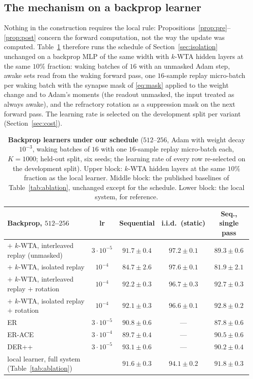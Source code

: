 \documentclass{article}
\newcommand{\kwta}{$k$-WTA}
\begin{document}
\subsection{The mechanism on a backprop learner}
\label{sec:bpk}
Nothing in the construction requires the local rule: Propositions~\ref{prop:pre}--\ref{prop:post}
concern the forward computation, not the way the update was computed. Table~\ref{tab:bpk}
therefore runs the schedule of Section~\ref{sec:isolation} unchanged on a backprop MLP of the
same width with \kwta{} hidden layers at the same $10\%$ fraction: waking batches of $16$
with an unmasked Adam step, awake sets read from the waking forward pass, one $16$-sample
replay micro-batch per waking batch with the synapse mask of \eqref{eq:mask} applied to the
weight change and to Adam's moments (the readout unmasked, the input treated as always
awake), and the refractory rotation as a suppression mask on the next forward pass. The
learning rate is selected on the development split per variant (Section~\ref{sec:cost}).

\begin{table}[t]
\centering
\caption{\textbf{Backprop learners under our schedule} ($512$--$256$, Adam with weight decay
$10^{-3}$, waking batches of $16$ with one $16$-sample replay micro-batch each, $K{=}1000$;
held-out split, six seeds; the learning rate of every row re-selected on the development
split). Upper block: \kwta{} hidden layers at the same $10\%$ fraction as the local learner.
Middle block: the published baselines of Table~\ref{tab:ablation}, unchanged except for the
schedule. Lower block: the local system, for reference.}
\label{tab:bpk}
\small
\begin{tabular}{@{}lcccc@{}}
\toprule
Backprop, $512$--$256$ & lr & Sequential & i.i.d.\ (static) & Seq., single pass \\
\midrule
$+$ \kwta{}, interleaved replay (unmasked) & $3{\cdot}10^{-5}$ & $91.7\pm0.4$ & $97.2\pm0.1$ & $89.3\pm0.6$ \\
$+$ \kwta{}, isolated replay & $10^{-4}$ & $84.7\pm2.6$ & $97.6\pm0.1$ & $81.9\pm2.1$ \\
$+$ \kwta{}, interleaved replay $+$ rotation & $10^{-4}$ & $92.2\pm0.3$ & $96.7\pm0.3$ & $92.7\pm0.3$ \\
$+$ \kwta{}, isolated replay $+$ rotation & $10^{-4}$ & $92.1\pm0.3$ & $96.6\pm0.1$ & $92.8\pm0.2$ \\
\midrule
ER & $3{\cdot}10^{-5}$ & $90.8\pm0.6$ & --- & $87.8\pm0.6$ \\
ER-ACE & $3{\cdot}10^{-4}$ & $89.7\pm0.4$ & --- & $90.5\pm0.6$ \\
DER++ & $3{\cdot}10^{-5}$ & $\mathbf{93.1\pm0.6}$ & --- & $90.2\pm0.4$ \\
\midrule
local learner, full system (Table~\ref{tab:ablation}) & & $91.6\pm0.3$ & $94.1\pm0.2$ & $\mathbf{91.8\pm0.3}$ \\
\bottomrule
\end{tabular}
\end{table}
\end{document}
